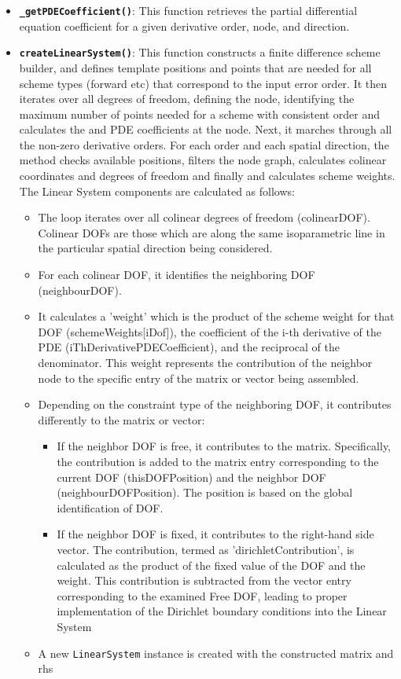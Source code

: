 \documentclass{article}
\begin{document}
\begin{itemize}
\begin{itemize}
 				\item \textbf{\texttt{\_getPDECoefficient()}}: This function retrieves the partial differential equation coefficient for a given derivative order, node, and direction.
 					\item \textbf{\texttt{createLinearSystem()}}: This function constructs a finite difference scheme builder, and defines template positions and points that are needed for all scheme types (forward etc) that correspond to the input error order. It then iterates over all degrees of freedom, defining the node, identifying the maximum number of points needed for a scheme with consistent order and calculates the  and PDE coefficients at the node. Next, it marches through all the non-zero derivative orders. For each order and each spatial direction, the method checks available positions, filters the node graph, calculates colinear coordinates and degrees of freedom and finally and calculates scheme weights. The Linear System components are calculated as follows:
 				\begin{itemize}
 					\item The loop iterates over all colinear degrees of freedom (colinearDOF). Colinear DOFs are those which are along the same isoparametric line in the particular spatial direction being considered.
 					\item For each colinear DOF, it identifies the neighboring DOF (neighbourDOF).
 					\item It calculates a 'weight' which is the product of the scheme weight for that DOF (schemeWeights[iDof]), the coefficient of the i-th derivative of the PDE (iThDerivativePDECoefficient), and the reciprocal of the denominator. This weight represents the contribution of the neighbor node to the specific entry of the matrix or vector being assembled.
 					\item Depending on the constraint type of the neighboring DOF, it contributes differently to the matrix or vector:
 					\begin{itemize}
 						\item If the neighbor DOF is free, it contributes to the matrix. Specifically, the contribution is added to the matrix entry corresponding to the current DOF (thisDOFPosition) and the neighbor DOF (neighbourDOFPosition). The position is based on the global identification of DOF.
 						\item If the neighbor DOF is fixed, it contributes to the right-hand side vector. The contribution, termed as 'dirichletContribution', is calculated as the product of the fixed value of the DOF and the weight. This contribution is subtracted from the vector entry corresponding to the examined Free DOF, leading to proper implementation of the Dirichlet boundary conditions into the Linear System
 					\end{itemize}
 					\item A new \texttt{LinearSystem} instance is created with the constructed matrix and rhs
 			\end{itemize}
 			

\end{itemize}
\end{itemize}
\end{document}
